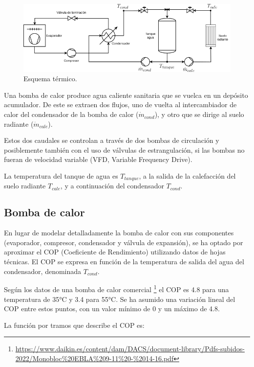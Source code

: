 \begin{figure}[h] \centering
	\centering
	\includegraphics[width=1\textwidth]{./capitulos/resultados_discusion/images/sistema_termico.png}
	\caption{Esquema térmico.}
	\label{fig:thermal_diagram}
\end{figure}

Una bomba de calor produce agua caliente sanitaria que se vuelca en un depósito acumulador.
De este se extraen dos flujos, uno de vuelta al intercambiador de calor del condensador
de la bomba de calor ($\dot{m}_{cond}$), y otro que se dirige al suelo radiante ($\dot{m}_{cale}$).

Estos dos caudales se controlan a través de dos bombas de circulación y
posiblemente también con el uso de válvulas de estrangulación, si las bombas no
fueran de velocidad variable (VFD, Variable Frequency Drive).

La temperatura del tanque de agua es $T_{tanque}$, a la salida de la calefacción
del suelo radiante $T_{cale}$, y a continuación del condensador $T_{cond}$.

\subsection{Bomba de calor}

En lugar de modelar detalladamente la bomba de calor con sus componentes
(evaporador, compresor, condensador y válvula de expansión), se ha optado por
aproximar el COP (Coeficiente de Rendimiento) utilizando datos de hojas
técnicas. El COP se expresa en función de la temperatura de salida del agua del
condensador, denominada $T_{cond}$.

Según los datos de una bomba de calor comercial
\footnote{\url{https://www.daikin.es/content/dam/DACS/document-library/Pdfs-subidos-2022/Monobloc\%20EBLA\%209-11\%20-\%2014-16.pdf}}
el COP es 4.8 para una temperatura de 35°C y 3.4 para 55°C.
Se ha asumido una variación lineal del COP entre estos puntos, con un valor
mínimo de 0 y un máximo de 4.8.

La función por tramos que describe el COP es:

